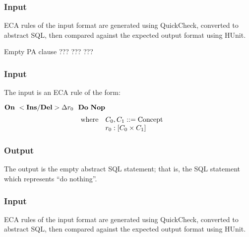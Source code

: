 \documentclass[12pt]{report}
\begin{document}
\vspace{-12pt}\subsubsection*{Input}

ECA rules of the input format are generated using QuickCheck, converted to
  abstract SQL, then compared against the expected output format using HUnit.

{Empty PA clause} 
{???}  
{???}
{???}
\vspace{-12pt}\subsubsection*{Input}
The input is an ECA rule of the form:

$\mathbf{On~} <\mathbf{Ins}/\mathbf{Del}> {\Delta}{r_0} \,\,\,\,\mathbf{Do~} \mathbf{Nop~} $
\vspace{-10pt}\[\hspace{-20pt}\begin{array}{ll}
\text{where} & C_0, C_1 ::= \text{Concept} \\ 
             & r_0 : [ C_0 \times C_1 ] \\ 
\end{array}\]

\vspace{-12pt}\subsubsection*{Output}

The output is the empty abstract SQL statement; that is, the SQL statement which
represents ``do nothing''.

\vspace{-12pt}\subsubsection*{Input}

ECA rules of the input format are generated using QuickCheck, converted to
  abstract SQL, then compared against the expected output format using HUnit.
\end{document}
